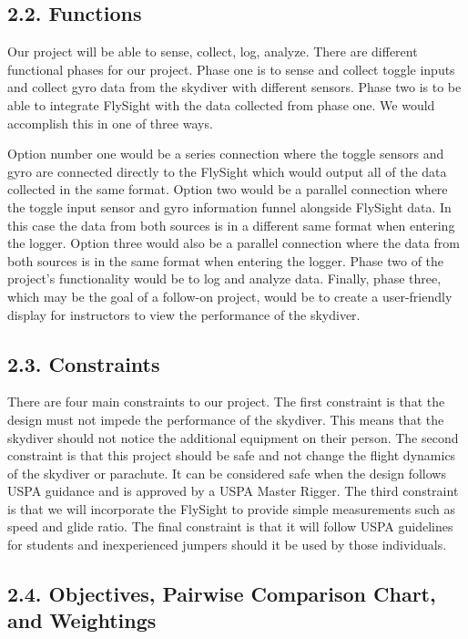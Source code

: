 \documentclass[10pt]{article}
\begin{document}
\subsection{2.2. Functions}

Our project will be able to sense, collect, log, analyze. There are different functional phases for our project. Phase one is to sense and collect toggle inputs and collect gyro data from the skydiver with different sensors. Phase two is to be able to integrate FlySight with the data collected from phase one. We would accomplish this in one of three ways. 



Option number one would be a series connection where the toggle sensors and gyro are connected directly to the FlySight which would output all of the data collected in the same format. Option two would be a parallel connection where the toggle input sensor and gyro information funnel alongside FlySight data. In this case the data from both sources is in a different same format when entering the logger. Option three would also be a parallel connection where the data from both sources is in the same format when entering the logger. Phase two of the project’s functionality would be to log and analyze data. Finally, phase three, which may be the goal of a follow-on project, would be to create a user-friendly display for instructors to view the performance of the skydiver.



\subsection{2.3. Constraints}

There are four main constraints to our project. The first constraint is that the design must not impede the performance of the skydiver. This means that the skydiver should not notice the additional equipment on their person. The second constraint is that this project should be safe and not change the flight dynamics of the skydiver or parachute. It can be considered safe when the design follows USPA guidance and is approved by a USPA Master Rigger. The third constraint is that we will incorporate the FlySight to provide simple measurements such as speed and glide ratio. The final constraint is that it will follow USPA guidelines for students and inexperienced jumpers should it be used by those individuals.



\subsection{2.4. Objectives, Pairwise Comparison Chart, and Weightings}
\end{document}
